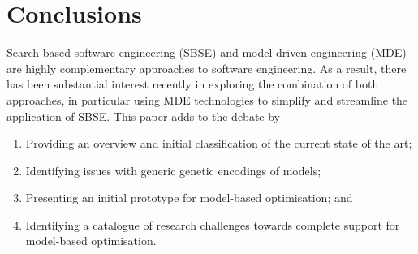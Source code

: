 \section{Conclusions}
\label{section:conclusions}

  Search-based software engineering (SBSE) and model-driven engineering (MDE) are highly complementary approaches to software engineering. As a result, there has 
	been substantial interest recently in exploring the combination of both approaches, in particular using MDE technologies to simplify and streamline the 
	application of SBSE. This paper adds to the debate by
	\begin{enumerate}
		\item Providing an overview and initial classification of the current state of the art;
		\item Identifying issues with generic genetic encodings of models;
		\item Presenting an initial prototype for model-based optimisation; and
		\item Identifying a catalogue of research challenges towards complete support for model-based optimisation.
	\end{enumerate}